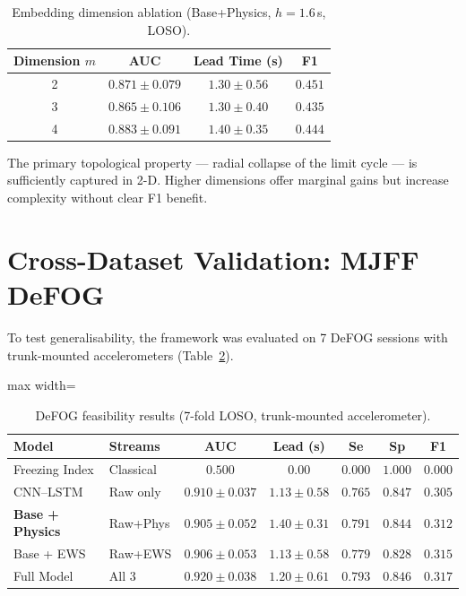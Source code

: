 \documentclass[12pt,a4paper,oneside]{report}
\numberwithin{equation}{chapter}
\numberwithin{figure}{chapter}
\numberwithin{table}{chapter}
\begin{document}
\begin{table}[ht]
\centering
\caption{Embedding dimension ablation (Base+Physics, $h=1.6$\,s, LOSO).}
\label{tab:embed}
\renewcommand{\arraystretch}{1.25}
\begin{tabular}{cccc}
\toprule
\textbf{Dimension $m$} & \textbf{AUC} & \textbf{Lead Time (s)} & \textbf{F1} \\
\midrule
2 & $0.871 \pm 0.079$ & $1.30 \pm 0.56$ & $\mathbf{0.451}$ \\
3 & $0.865 \pm 0.106$ & $1.30 \pm 0.40$ & $0.435$ \\
4 & $\mathbf{0.883 \pm 0.091}$ & $\mathbf{1.40 \pm 0.35}$ & $0.444$ \\
\bottomrule
\end{tabular}
\end{table}

The primary topological property --- radial collapse of the limit cycle --- is sufficiently captured in 2-D. Higher dimensions offer marginal gains but increase complexity without clear F1 benefit.

\section{Cross-Dataset Validation: MJFF DeFOG}

To test generalisability, the framework was evaluated on 7 DeFOG sessions with trunk-mounted accelerometers (Table~\ref{tab:defog}).

\begin{table}[ht]
\centering
\caption{DeFOG feasibility results (7-fold LOSO, trunk-mounted accelerometer).}
\label{tab:defog}
\renewcommand{\arraystretch}{1.25}
\begin{adjustbox}{max width=\textwidth}
\begin{tabular}{llccccc}
\toprule
\textbf{Model} & \textbf{Streams} & \textbf{AUC} & \textbf{Lead (s)} & \textbf{Se} & \textbf{Sp} & \textbf{F1} \\
\midrule
Freezing Index & Classical & $0.500$ & $0.00$ & $0.000$ & $1.000$ & $0.000$ \\
CNN--LSTM      & Raw only  & $0.910\!\pm\!0.037$ & $1.13\!\pm\!0.58$ & $0.765$ & $0.847$ & $0.305$ \\
\textbf{Base + Physics} & Raw+Phys & $0.905\!\pm\!0.052$ & $\mathbf{1.40\!\pm\!0.31}$ & $\mathbf{0.791}$ & $0.844$ & $0.312$ \\
Base + EWS     & Raw+EWS   & $0.906\!\pm\!0.053$ & $1.13\!\pm\!0.58$ & $0.779$ & $0.828$ & $0.315$ \\
Full Model     & All 3     & $\mathbf{0.920\!\pm\!0.038}$ & $1.20\!\pm\!0.61$ & $0.793$ & $\mathbf{0.846}$ & $\mathbf{0.317}$ \\
\bottomrule
\end{tabular}
\end{adjustbox}
\end{table}
\end{document}
